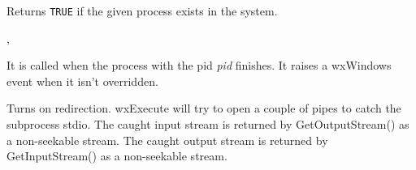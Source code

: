 
Returns {\tt TRUE} if the given process exists in the system.


,\rtfsp
{}

\label{wxprocessonterminate}


It is called when the process with the pid {\it pid} finishes.
It raises a wxWindows event when it isn't overridden.



\label{wxprocessredirect}


Turns on redirection. wxExecute will try to open a couple of pipes
to catch the subprocess stdio. The caught input stream is returned by
GetOutputStream() as a non-seekable stream. The caught output stream is returned
by GetInputStream() as a non-seekable stream.

